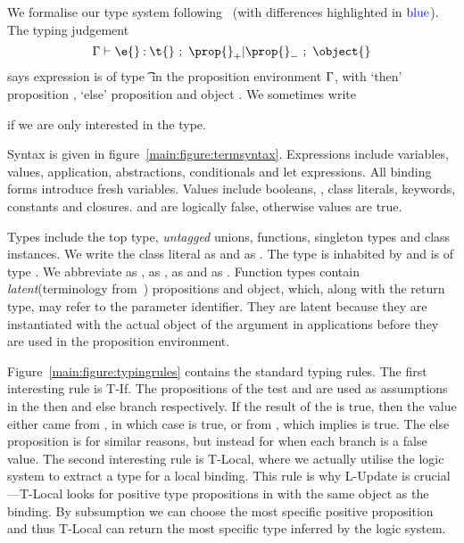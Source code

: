 We formalise our type system following~\citet{TF10}
(with differences highlighted in $\mathbin{\textcolor{blue}{\text{blue}}}$).
The typing judgement 
$$
{\judgement   {\propenv}
              {\hastype {\e{}} {\t{}}}
  {\filterset {\thenprop {\prop{}}}
              {\elseprop {\prop{}}}}
  {\object{}}}
$$
says expression \e{} is of type \t{} in the 
proposition environment $\Gamma{}$, with 
`then' proposition {\thenprop {\prop{}}}, `else' proposition {\elseprop {\prop{}}}
and object \object{}. We sometimes write 
{\judgementtwo{\propenv}{\hastype {\e{}} {\t{}}} if we are only interested in the type.

Syntax is given in figure~\ref{main:figure:termsyntax}. Expressions include variables, values,
application, abstractions, conditionals and let expressions.
All binding forms introduce fresh variables.
Values include booleans, \nil{}, class literals, keywords, 
constants and closures. \false{} and \nil{} are logically false, otherwise values are true.

Types include the top type, \emph{untagged} unions, functions, singleton types
and class instances. 
We write the class literal  as \Boolean{} and  as \Keyword{}.
The type \Value{\Keyword} is inhabited by  and  is of type \Keyword{}.
We abbreviate \EmptyUnion{} as \Bot{}, {\ValueNil} as \Nil{}, 
{\ValueTrue} as \True and {\ValueFalse} as {\False}.
Function types contain \emph{latent}(terminology from~\cite{Lucassen88polymorphiceffect}) propositions and object, which, along with the return type,
may refer to the parameter identifier. They are latent because they are instantiated with the
actual object of the argument in applications before they are used in the proposition environment.

Figure~\ref{main:figure:typingrules} contains the standard typing rules.
The first interesting rule is T-If. The propositions of the test  and 
are used as assumptions in the then and else branch respectively.
If the result of the \ifliteral{} is true, then the value either
came from , in which case  is true, or from ,
which implies  is true. 
The else proposition is  for
similar reasons, but instead for when each branch is a false value.
The second interesting rule is T-Local, where we actually utilise the logic system
to extract a type for a local binding. This rule is why L-Update is crucial---T-Local
looks for positive type propositions in \propenv{} with the same object as the binding.
By subsumption we can choose the most specific positive proposition and thus
T-Local can return the most specific type inferred by the logic system.

}
